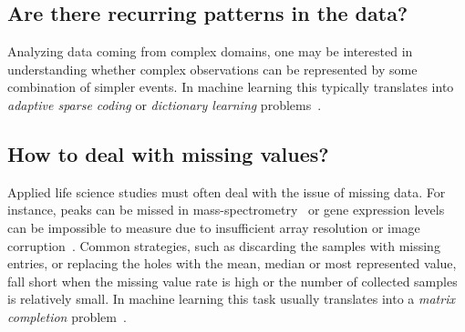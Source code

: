 \subsection{Are there recurring patterns in the data? } %
Analyzing data coming from complex domains, one may be interested in understanding whether complex observations can be represented by some combination of simpler events. In machine learning this typically translates into \textit{adaptive sparse coding} or \textit{dictionary learning} problems~\cite{masecchia2015genome, alexandrov2013signatures}.


\subsection{How to deal with missing values?} %
Applied life science studies must often deal with the issue of missing data. For instance, peaks can be missed in mass-spectrometry~\cite{jung2014adaption} or gene expression levels can be impossible to measure due to insufficient array resolution or image corruption~\cite{stekhoven2011missforest, troyanskaya2001missing}. Common strategies, such as discarding the samples with missing entries, or replacing the holes with the mean, median or most represented value, fall short when the missing value rate is high or the number of collected samples is relatively small. In machine learning this task usually translates into a \textit{matrix completion} problem~\cite{candes2009exact}.
